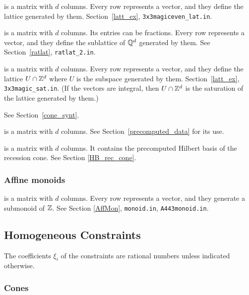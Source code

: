 \begin{itemize}
	\itemtt[lattice] is a matrix with $d$ columns. Every row represents a vector, and they define the lattice generated by them. Section~\ref{latt_ex}, \verb|3x3magiceven_lat.in|.
	
	 is a matrix with $d$ columns. Its entries can be fractions. Every row represents a vector, and they define the sublattice of ${\mathbb Q}^d$ generated by them. See Section~\ref{ratlat}, \verb|ratlat_2.in|.
	
	\itemtt[saturation] is a matrix with $d$ columns. Every row represents a vector, and they define the lattice $U\cap {\mathbb Z}^d$ where $U$ is the subspace generated by them. Section~\ref{latt_ex}, \verb|3x3magic_sat.in|. (If the vectors are integral, then $U\cap {\mathbb Z}^d$ is the saturation of the lattice generated by them.)
	
	 See Section~\ref{cone_synt}.
	
	 is a matrix with $d$ columns. See Section~\ref{precomputed_data} for its use.
	
	 is a matrix with $d$ columns. It contains the precomputed Hilbert basis of the recession cone. See Section \ref{HB_rec_cone}.
\end{itemize}

\subsubsection{Affine monoids}

\begin{itemize}
	\itemtt[monoid] is a matrix with $d$ columns. Every row represents a vector, and they generate a submonoid of ${\mathbb Z}$. See Section \ref{AffMon}, \verb|monoid.in|, \verb|A443monoid.in|.
\end{itemize}

\subsection{Homogeneous Constraints}

The coefficients $\xi_i$ of the constraints are rational numbers unless indicated otherwise.

\subsubsection{Cones}\label{HomConstrCone}

